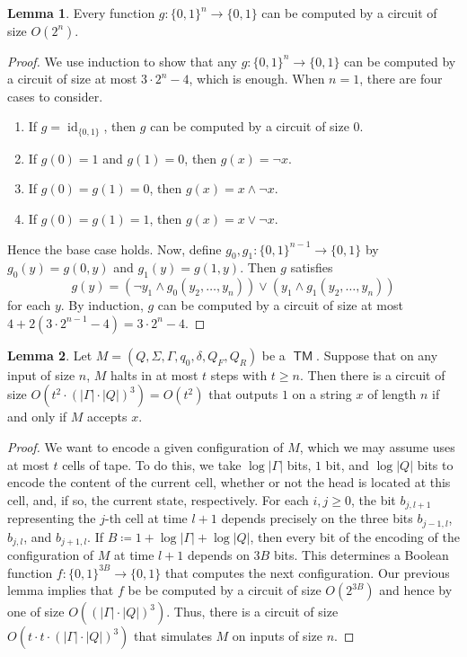 \documentclass[10pt,letterpaper,cm]{nupset}
\theoremstyle{definition}
\newtheorem{lemma}{Lemma}
\newcommand{\1}{\mathbf{1}}
\newcommand{\0}{\vec 0}
\DeclareMathOperator{\id}{id}
\DeclareMathOperator{\TM}{\mathsf{TM}}
\begin{document}
\begin{lemma}
Every function $g: \{0,1\}^n \to \{0,1\}$ can be computed by a circuit of size $O(2^n)$. 
\end{lemma}
\begin{proof}
We use induction to show that any $g:\{0,1\}^n \to \{0,1\}$ can be computed by a circuit of size at most $3 \cdot 2^n -4$, which is enough. When $n=1$, there are four cases to consider.
\begin{enumerate}[label=(\alph*)]
\item If $g= \id_{\{0,1\}}$, then $g$ can be computed by a circuit of size $0$.
\item If $g(0) =1$ and $g(1) =0$, then $g(x) = \neg x$.
\item If $g(0) = g(1) = 0$, then $g(x) = x \land \neg x$.
\item If $g(0) = g(1) = 1$, then $g(x) = x \vee \neg x$.
\end{enumerate}
Hence the base case holds. Now, define $g_0, g_1 : \{0,1 \}^{n-1} \to \{0,1\}$ by $g_0(y) = g(0, y)$ and $g_1(y) = g(1,y)$. Then $g$ satisfies $$g(y) = (\neg y_1 \land g_0(y_2, \ldots, y_n)) \vee (y_1 \land g_1(y_2, \ldots, y_n))$$ for each $y$. By induction, $g$ can be computed by a circuit of size at most $4 + 2(3 \cdot 2^{n-1} -4) = 3 \cdot 2^n -4$. 
\end{proof}

\begin{lemma}
Let $M= (Q, \Sigma, \Gamma, q_0, \delta, Q_F, Q_R)$ be a $\TM$. Suppose that on any input of size $n$, $M$ halts in at most $t$ steps with $t\geq n$. Then there is a circuit of size $O(t^2 \cdot (|\Gamma|\cdot |Q|)^3) = O(t^2)$ that  outputs $1$ on a  string $x$ of length $n$ if and only if $M$ accepts $x$.
\end{lemma}
\begin{proof}
We want to encode a given configuration of $M$, which we may assume uses at most $t$ cells of tape. To do this, we take $\log{|\Gamma|}$ bits, $1$ bit, and $\log{|Q|}$ bits to encode the content of the current cell, whether or not the head is located at this cell, and, if so, the current state, respectively.  For each $i,j\geq0$, the bit $b_{j, l+1}$ representing the $j$-th cell at time $l+1$ depends precisely on the three bits $b_{j-1, l}$, $b_{j, l}$, and $b_{j+1, l}$. If $B\coloneqq 1+ \log{|\Gamma|} +\log{|Q|}$, then every bit of the encoding of the configuration of $M$ at time $l+1$ depends on $3B$ bits. This determines a Boolean function $f: \{0,1\}^{3B}\to \{0,1\}$ that computes the next configuration. Our previous lemma implies that $f$ be be computed by a circuit of size $O(2^{3B})$ and hence by one of size $O((|\Gamma|\cdot |Q|)^3)$. Thus, there is a circuit of size $O(t\cdot t\cdot  (|\Gamma| \cdot |Q|)^3 )$ that simulates $M$ on inputs of size $n$.
\end{proof}
\end{document}
